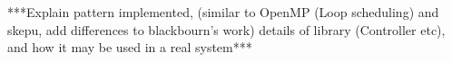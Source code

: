 \section{}

***Explain pattern implemented, (similar to OpenMP (Loop scheduling) and skepu, add differences to blackbourn's work) details of library (Controller etc), and how it may be used in a real system***
